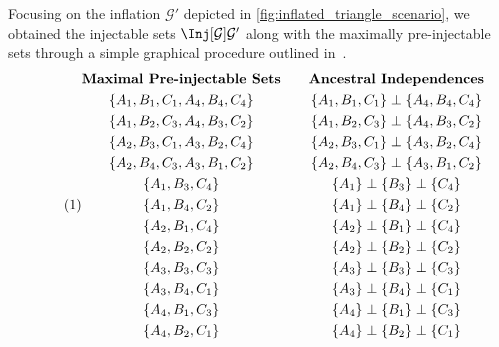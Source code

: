 \documentclass[aps, 10pt, english, twoside, pra, nofootinbib, longbibliography]{revtex4-1}
\theoremstyle{plain}
\theoremstyle{definition}
\theoremstyle{remark}
\newcommand{\graph}{\mathcal{G}}
\newcommand{\ancestralindep}{\perp}
\newcommand{\ts}{{\graph}}
\begin{document}
    Focusing on the inflation $\ts'$ depicted in \cref{fig:inflated_triangle_scenario}, we obtained the injectable sets $\Inj[\ts]{\ts'}$ along with the maximally pre-injectable sets through a simple graphical procedure outlined in~\cite{Inflation}.
    \begin{equation*}
        \eq \label{eq:pre-injectable_triangle_scenario}
        \begin{gathered}
            \textbf{Maximal Pre-injectable Sets} \\
            \bc{A_1, B_1, C_1, A_4, B_4, C_4} \\
            \bc{A_1, B_2, C_3, A_4, B_3, C_2} \\
            \bc{A_2, B_3, C_1, A_3, B_2, C_4} \\
            \bc{A_2, B_4, C_3, A_3, B_1, C_2} \\
            \bc{A_1, B_3, C_4} \\
            \bc{A_1, B_4, C_2} \\
            \bc{A_2, B_1, C_4} \\
            \bc{A_2, B_2, C_2} \\
            \bc{A_3, B_3, C_3} \\
            \bc{A_3, B_4, C_1} \\
            \bc{A_4, B_1, C_3} \\
            \bc{A_4, B_2, C_1}
        \end{gathered}
        \qquad
        \begin{gathered}
            \textbf{Ancestral Independences} \\
            \bc{A_1, B_1, C_1} \ancestralindep \bc{A_4, B_4, C_4} \\
            \bc{A_1, B_2, C_3} \ancestralindep \bc{A_4, B_3, C_2} \\
            \bc{A_2, B_3, C_1} \ancestralindep \bc{A_3, B_2, C_4} \\
            \bc{A_2, B_4, C_3} \ancestralindep \bc{A_3, B_1, C_2} \\
            \bc{A_1} \ancestralindep \bc{B_3} \ancestralindep \bc{C_4} \\
            \bc{A_1} \ancestralindep \bc{B_4} \ancestralindep \bc{C_2} \\
            \bc{A_2} \ancestralindep \bc{B_1} \ancestralindep \bc{C_4} \\
            \bc{A_2} \ancestralindep \bc{B_2} \ancestralindep \bc{C_2} \\
            \bc{A_3} \ancestralindep \bc{B_3} \ancestralindep \bc{C_3} \\
            \bc{A_3} \ancestralindep \bc{B_4} \ancestralindep \bc{C_1} \\
            \bc{A_4} \ancestralindep \bc{B_1} \ancestralindep \bc{C_3} \\
            \bc{A_4} \ancestralindep \bc{B_2} \ancestralindep \bc{C_1}
        \end{gathered}
    \end{equation*}
\end{document}
